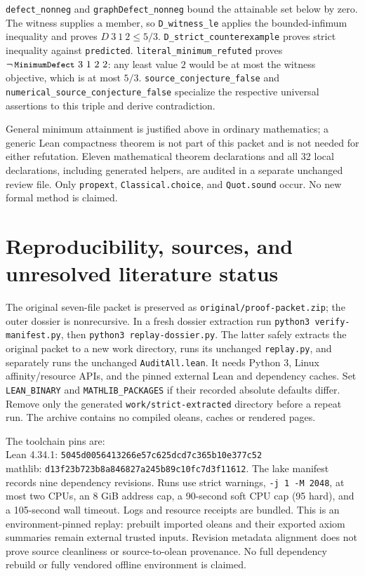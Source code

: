 \documentclass[11pt]{article}
\newcommand{\code}[1]{\texttt{\small #1}}
\begin{document}
\code{defect\_nonneg} and \code{graphDefect\_nonneg} bound the attainable
set below by zero. The witness supplies a member, so
\code{D\_witness\_le} applies the bounded-infimum inequality and proves
$D\ 3\ 1\ 2\leq5/3$.
\code{D\_strict\_counterexample} proves strict inequality against
\code{predicted}. \code{literal\_minimum\_refuted} proves
$\neg\,\code{MinimumDefect}\ 3\ 1\ 2\ 2$: any least value $2$ would be
at most the witness objective, which is at most $5/3$.
\code{source\_conjecture\_false} and
\code{numerical\_source\_conjecture\_false} specialize the respective
universal assertions to this triple and derive contradiction.

General minimum attainment is justified above in ordinary mathematics;
a generic Lean compactness theorem is not part of this packet and is not
needed for either refutation. Eleven mathematical theorem declarations and
all 32 local declarations, including generated helpers, are audited in a
separate unchanged review file. Only \code{propext}, \code{Classical.choice},
and \code{Quot.sound} occur. No new formal method is claimed.

\newpage
\section{Reproducibility, sources, and unresolved literature status}
\small\raggedright\setlength{\parskip}{3pt}
The original seven-file packet is preserved as \code{original/proof-packet.zip};
the outer dossier is nonrecursive. In a fresh dossier extraction run
\code{python3 verify-manifest.py}, then \code{python3 replay-dossier.py}.
The latter safely extracts the original packet to a new work directory, runs
its unchanged \code{replay.py}, and separately runs the unchanged
\code{AuditAll.lean}. It needs Python 3, Linux affinity/resource APIs, and
the pinned external Lean and dependency caches. Set \code{LEAN\_BINARY} and
\code{MATHLIB\_PACKAGES} if their recorded absolute defaults differ.
Remove only the generated \code{work/strict-extracted} directory before a
repeat run. The archive contains no compiled oleans, caches or rendered pages.

The toolchain pins are:\\
Lean 4.34.1: \code{5045d0056413266e57c625dcd7c365b10e377c52}\\
mathlib: \code{d13f23b723b8a846827a245b89c10fc7d3f11612}.
The lake manifest records nine dependency revisions. Runs use strict warnings,
\code{-j 1 -M 2048}, at most two CPUs, an 8 GiB address cap, a 90-second soft
CPU cap (95 hard), and a 105-second wall timeout. Logs and resource receipts
are bundled. This is an environment-pinned replay: prebuilt imported oleans
and their exported axiom summaries remain external trusted inputs. Revision
metadata alignment does not prove source cleanliness or source-to-olean
provenance. No full dependency rebuild or fully vendored offline environment
is claimed.
\end{document}
